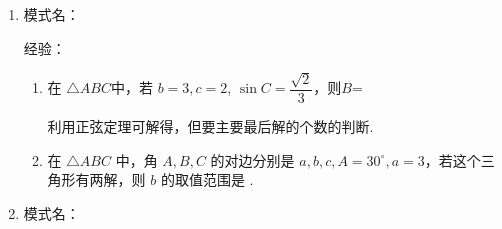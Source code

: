 \begin{enumerate}
    经验：
    \begin{enumerate}     
        \item 将函数$y = sinx$的图像上的所有点向左平移$\dfrac{\pi}{3}$个长度，再把图像上各点的横坐标变为原来的2倍，则最后得到的图像对应的函数解析式为
        \begin{jieda}
            平移后函数解析式为$y = sin(x + \dfrac{\pi}{3})$，伸缩变换后函数解析式为$y = sin(\dfrac{x}{2}+\dfrac{\pi}{3})$.
        \end{jieda}
    
    \item 为了得到函数$y=\sin(3x+\frac{\pi}{6})$的图像, 只需把函数$y=\sin3x$的图像\dotfill()
    \xx
    {向左平移$\frac{\pi}{6}$}
    {向左平移$\frac{\pi}{18}$}
    {向右平移$\frac{\pi}{6}$}
    {向右平移$\frac{\pi}{18}$}
    \end{enumerate}

    \item 
    模式名：

    经验：
    \begin{enumerate}
        \item 在 $\triangle{ABC}$中，若 $b=3, c=2$, $\sin C=\dfrac{\sqrt{2}}{3}$，则$B$=
        \begin{jieda}
            利用正弦定理可解得，但要主要最后解的个数的判断.
        \end{jieda}
        \item 在 $\triangle A B C$ 中，角 $A, B,C$ 的对边分别是 $a, b, c, A=30^{\circ}, a=3$，若这个三角形有两解，则 $b$ 的取值范围是 .
    \end{enumerate}
    \item 
    模式名：


\end{enumerate}
